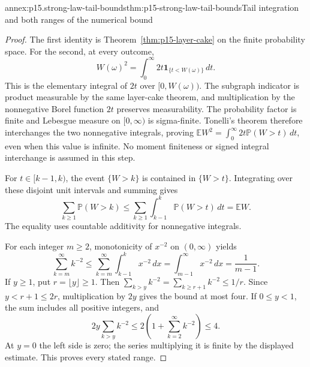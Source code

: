 \begin{annexitem}{annex:p15.strong-law-tail-bounds}{thm:p15-strong-law-tail-bounds}{Tail integration and both ranges of the numerical bound}
\begin{proof}
The first identity is Theorem~\ref{thm:p15-layer-cake} on the
finite probability space. For the second, at every outcome,
\[
 W(\omega)^2=\int_0^\infty
                       2t\mathbf1_{\{t<W(\omega)\}}\,dt.
\]
This is the elementary integral of \(2t\) over \([0,W(\omega))\).
The subgraph indicator is product measurable by the same layer-cake
theorem, and multiplication by the nonnegative Borel function \(2t\)
preserves measurability. The probability factor is finite and Lebesgue
measure on \([0,\infty)\) is sigma-finite. Tonelli's theorem therefore
interchanges the two nonnegative integrals, proving
\(\mathbb EW^2=\int_0^\infty2t\mathbb P(W>t)\,dt\), even
when this value is infinite. No moment finiteness or signed integral
interchange is assumed in this step.

For \(t\in[k-1,k)\), the event \(\{W>k\}\) is contained
in \(\{W>t\}\). Integrating over these disjoint unit intervals
and summing gives
\[
 \sum_{k\geq1}\mathbb P(W>k)
  \leq\sum_{k\geq1}\int_{k-1}^k\mathbb P(W>t)\,dt
  =\mathbb EW.
\]
The equality uses countable additivity for nonnegative integrals.

For each integer \(m\geq2\), monotonicity of \(x^{-2}\) on
\((0,\infty)\) yields
\[
 \sum_{k=m}^\infty k^{-2}
     \leq\sum_{k=m}^\infty\int_{k-1}^k x^{-2}\,dx
     =\int_{m-1}^\infty x^{-2}\,dx
     =\frac1{m-1}.
\]
If \(y\geq1\), put \(r=\lfloor y\rfloor\geq1\). Then
\(\sum_{k>y}k^{-2}=\sum_{k\geq r+1}k^{-2}\leq1/r\).
Since \(y<r+1\leq2r\), multiplication by \(2y\) gives the
bound at most four. If \(0\leq y<1\), the sum includes all
positive integers, and
\[
 2y\sum_{k>y}k^{-2}
   \leq2\left(1+\sum_{k=2}^\infty k^{-2}\right)\leq4.
\]
At \(y=0\) the left side is zero; the series multiplying it is
finite by the displayed estimate. This proves every stated range.
\end{proof}
\end{annexitem}


